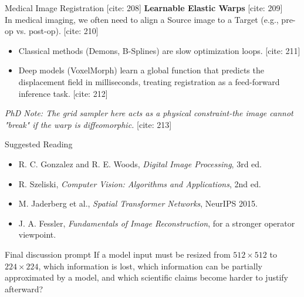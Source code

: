 \documentclass[aspectratio=169,10pt]{beamer}
\begin{document}
\begin{frame}{Medical Image Registration [cite: 208]}
    \textbf{Learnable Elastic Warps} [cite: 209]\\
    In medical imaging, we often need to align a Source image to a Target (e.g., pre-op vs. post-op). [cite: 210]
    
    \vspace{0.5em}
    \begin{itemize}
        \item Classical methods (Demons, B-Splines) are slow optimization loops. [cite: 211]
        \item Deep models (VoxelMorph) learn a global function that predicts the displacement field in milliseconds, treating registration as a feed-forward inference task. [cite: 212]
    \end{itemize}
    \vspace{1em}
    \textit{PhD Note: The grid sampler here acts as a physical constraint-the image cannot "break" if the warp is diffeomorphic.} [cite: 213]
\end{frame}


\begin{frame}{Suggested Reading}
\small
\begin{itemize}
\item R. C. Gonzalez and R. E. Woods, \emph{Digital Image Processing}, 3rd ed.
\item R. Szeliski, \emph{Computer Vision: Algorithms and Applications}, 2nd ed.
\item M. Jaderberg et al., \emph{Spatial Transformer Networks}, NeurIPS 2015.
\item J. A. Fessler, \emph{Fundamentals of Image Reconstruction}, for a stronger operator viewpoint.
\end{itemize}

\vspace{1em}
\begin{block}{Final discussion prompt}
If a model input must be resized from $512 \times 512$ to $224 \times 224$, which information is lost, which information can be partially approximated by a model, and which scientific claims become harder to justify afterward?
\end{block}
\end{frame}
\end{document}
